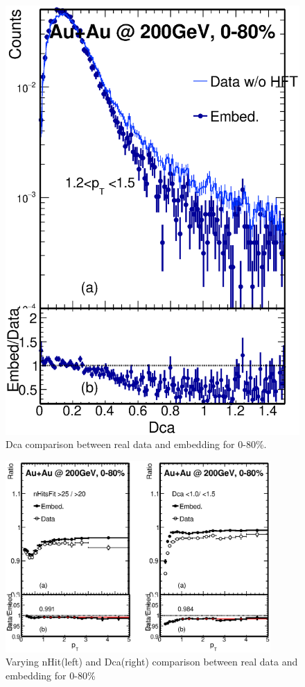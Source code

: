 \begin{figure}[htbp]
\begin{minipage}[htbp]{0.45\linewidth}
\includegraphics[width=1.0\textwidth,angle=0]{figure/Run14_D0HFT/Dca11_6.eps} 
\caption{ Dca comparison between real data and embedding for 0-80\%. \label{Dca_0_80}}
\end{minipage}
\end{figure}

\begin{figure}[htbp]
\centering
\includegraphics[keepaspectratio,width=0.9\textwidth]{figure/Run14_D0HFT/nFit_Dca_Ratio_7.eps}
\caption{Varying nHit(left) and Dca(right) comparison between real data and embedding for 0-80\% }
\label{fig:nFit_Dca_Ratio_7}
\end{figure}

